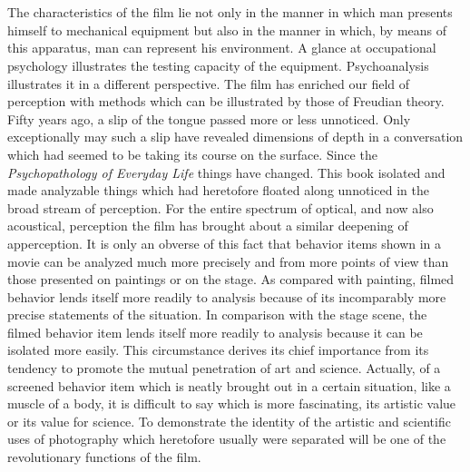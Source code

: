 \documentclass[11pt, letterpaper]{article}
\begin{document}
\section{}

The characteristics of the film lie not only in the manner in which man
presents himself to mechanical equipment but also in the manner in which, by
means of this apparatus, man can represent his environment. A glance at
occupational psychology illustrates the testing capacity of the equipment.
Psychoanalysis illustrates it in a different perspective. The film has enriched
our field of perception with methods which can be illustrated by those of
Freudian theory. Fifty years ago, a slip of the tongue passed more or less
unnoticed. Only exceptionally may such a slip have revealed dimensions of depth
in a conversation which had seemed to be taking its course on the surface.
Since the \textit{Psychopathology of Everyday Life} things have changed. This
book isolated and made analyzable things which had heretofore floated along
unnoticed in the broad stream of perception. For the entire spectrum of
optical, and now also acoustical, perception the film has brought about a
similar deepening of apperception. It is only an obverse of this fact that
behavior items shown in a movie can be analyzed much more precisely and from
more points of view than those presented on paintings or on the stage. As
compared with painting, filmed behavior lends itself more readily to analysis
because of its incomparably more precise statements of the situation. In
comparison with the stage scene, the filmed behavior item lends itself more
readily to analysis because it can be isolated more easily. This circumstance
derives its chief importance from its tendency to promote the mutual
penetration of art and science. Actually, of a screened behavior item which is
neatly brought out in a certain situation, like a muscle of a body, it is
difficult to say which is more fascinating, its artistic value or its value for
science. To demonstrate the identity of the artistic and scientific uses of
photography which heretofore usually were separated will be one of the
revolutionary functions of the film.
\end{document}

